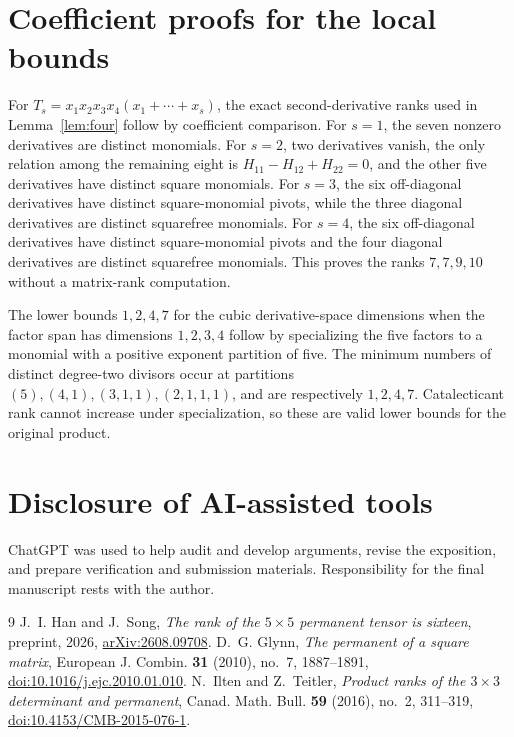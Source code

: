 \documentclass[11pt]{amsart}
\theoremstyle{definition}
\numberwithin{equation}{section}
\begin{document}
\section{Coefficient proofs for the local bounds}
For \(T_s=x_1x_2x_3x_4(x_1+\cdots+x_s)\), the exact second-derivative
ranks used in Lemma~\ref{lem:four} follow by coefficient comparison.
For \(s=1\), the seven nonzero derivatives are distinct monomials. For
\(s=2\), two derivatives vanish, the only relation among the remaining
eight is \(H_{11}-H_{12}+H_{22}=0\), and the other five derivatives have
distinct square monomials. For \(s=3\), the six off-diagonal derivatives
have distinct square-monomial pivots, while the three diagonal derivatives
are distinct squarefree monomials. For \(s=4\), the six off-diagonal
derivatives have distinct square-monomial pivots and the four diagonal
derivatives are distinct squarefree monomials. This proves the ranks
\(7,7,9,10\) without a matrix-rank computation.

The lower bounds \(1,2,4,7\) for the cubic derivative-space dimensions
when the factor span has dimensions \(1,2,3,4\) follow by specializing
the five factors to a monomial with a positive exponent partition of five.
The minimum numbers of distinct degree-two divisors occur at partitions
\((5),(4,1),(3,1,1),(2,1,1,1)\), and are respectively \(1,2,4,7\).
Catalecticant rank cannot increase under specialization, so these are
valid lower bounds for the original product.



\section*{Disclosure of AI-assisted tools}
ChatGPT was used to help audit and develop arguments, revise the exposition,
and prepare verification and submission materials. Responsibility for the
final manuscript rests with the author.

\begin{thebibliography}{9}
J.~I. Han and J.~Song, \emph{The rank of the \(5\times5\) permanent
tensor is sixteen}, preprint, 2026,
\href{https://arxiv.org/abs/2608.09708}{arXiv:2608.09708}.
D.~G. Glynn, \emph{The permanent of a square matrix},
European J. Combin. \textbf{31} (2010), no.~7, 1887--1891,
\href{https://doi.org/10.1016/j.ejc.2010.01.010}{doi:10.1016/j.ejc.2010.01.010}.
N.~Ilten and Z.~Teitler,
\emph{Product ranks of the \(3\times3\) determinant and permanent},
Canad. Math. Bull. \textbf{59} (2016), no.~2, 311--319,
\href{https://doi.org/10.4153/CMB-2015-076-1}{doi:10.4153/CMB-2015-076-1}.
\end{thebibliography}
\end{document}
